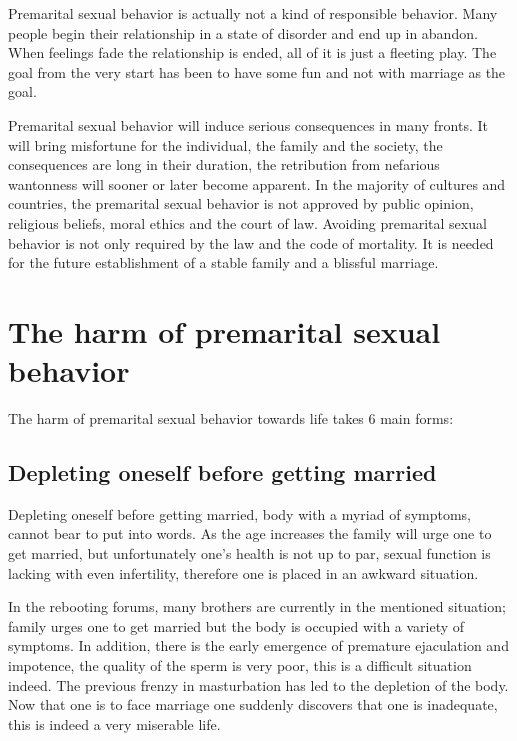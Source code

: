 \documentclass[
]{book}
\begin{document}
Premarital sexual behavior is actually not a kind of responsible behavior. Many people begin their relationship in a state of disorder and end up in abandon. When feelings fade the relationship is ended, all of it is just a fleeting play. The goal from the very start has been to have some fun and not with marriage as the goal.

Premarital sexual behavior will induce serious consequences in many fronts. It will bring misfortune for the individual, the family and the society, the consequences are long in their duration, the retribution from nefarious wantonness will sooner or later become apparent. In the majority of cultures and countries, the premarital sexual behavior is not approved by public opinion, religious beliefs, moral ethics and the court of law. Avoiding premarital sexual behavior is not only required by the law and the code of mortality. It is needed for the future establishment of a stable family and a blissful marriage.

\hypertarget{the-harm-of-premarital-sexual-behavior-1}{%
\section{The harm of premarital sexual behavior}\label{the-harm-of-premarital-sexual-behavior-1}}

The harm of premarital sexual behavior towards life takes 6 main forms:

\hypertarget{depleting-oneself-before-getting-married}{%
\subsection{Depleting oneself before getting married}\label{depleting-oneself-before-getting-married}}

Depleting oneself before getting married, body with a myriad of symptoms, cannot bear to put into words. As the age increases the family will urge one to get married, but unfortunately one's health is not up to par, sexual function is lacking with even infertility, therefore one is placed in an awkward situation.

In the rebooting forums, many brothers are currently in the mentioned situation; family urges one to get married but the body is occupied with a variety of symptoms. In addition, there is the early emergence of premature ejaculation and impotence, the quality of the sperm is very poor, this is a difficult situation indeed. The previous frenzy in masturbation has led to the depletion of the body. Now that one is to face marriage one suddenly discovers that one is inadequate, this is indeed a very miserable life.
\end{document}

